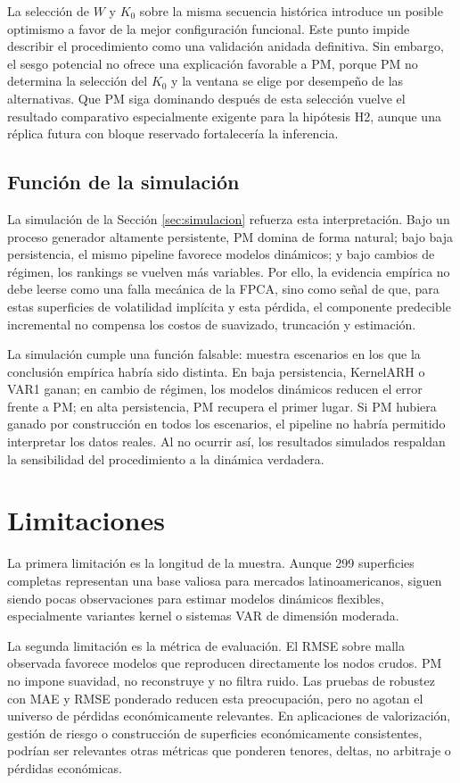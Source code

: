 \documentclass[a4paper,11pt]{article}
\newcommand{\SVIs}{superficies de volatilidad implícita}
\begin{document}
La selección de \(W\) y \(K_0\) sobre la misma secuencia histórica introduce un posible optimismo a favor de la mejor configuración funcional. Este punto impide describir el procedimiento como una validación anidada definitiva. Sin embargo, el sesgo potencial no ofrece una explicación favorable a PM, porque PM no determina la selección del \(K_0\) y la ventana se elige por desempeño de las alternativas. Que PM siga dominando después de esta selección vuelve el resultado comparativo especialmente exigente para la hipótesis H2, aunque una réplica futura con bloque reservado fortalecería la inferencia.

\subsection{Función de la simulación}

La simulación de la Sección \ref{sec:simulacion} refuerza esta interpretación. Bajo un proceso generador altamente persistente, PM domina de forma natural; bajo baja persistencia, el mismo pipeline favorece modelos dinámicos; y bajo cambios de régimen, los rankings se vuelven más variables. Por ello, la evidencia empírica no debe leerse como una falla mecánica de la FPCA, sino como señal de que, para estas \SVIs{} y esta pérdida, el componente predecible incremental no compensa los costos de suavizado, truncación y estimación.

La simulación cumple una función falsable: muestra escenarios en los que la conclusión empírica habría sido distinta. En baja persistencia, KernelARH o VAR1 ganan; en cambio de régimen, los modelos dinámicos reducen el error frente a PM; en alta persistencia, PM recupera el primer lugar. Si PM hubiera ganado por construcción en todos los escenarios, el pipeline no habría permitido interpretar los datos reales. Al no ocurrir así, los resultados simulados respaldan la sensibilidad del procedimiento a la dinámica verdadera.

\section{Limitaciones}

La primera limitación es la longitud de la muestra. Aunque 299 superficies completas representan una base valiosa para mercados latinoamericanos, siguen siendo pocas observaciones para estimar modelos dinámicos flexibles, especialmente variantes kernel o sistemas VAR de dimensión moderada.

La segunda limitación es la métrica de evaluación. El RMSE sobre malla observada favorece modelos que reproducen directamente los nodos crudos. PM no impone suavidad, no reconstruye y no filtra ruido. Las pruebas de robustez con MAE y RMSE ponderado reducen esta preocupación, pero no agotan el universo de pérdidas económicamente relevantes. En aplicaciones de valorización, gestión de riesgo o construcción de superficies económicamente consistentes, podrían ser relevantes otras métricas que ponderen tenores, deltas, no arbitraje o pérdidas económicas.
\end{document}
